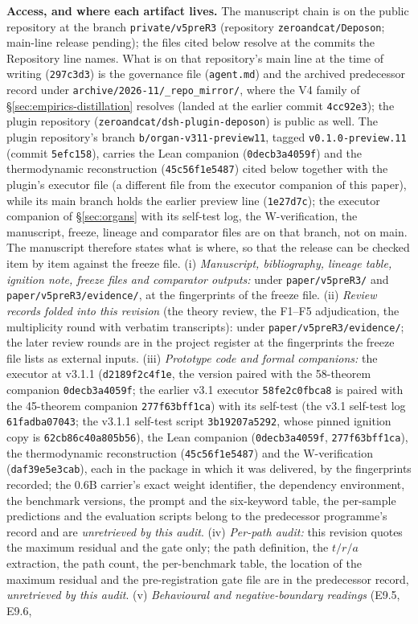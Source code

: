 \documentclass[11pt,a4paper]{article}
\begin{document}
\textbf{Access, and where each artifact lives.} The manuscript chain is on the public repository at the branch \texttt{private/}\allowbreak\texttt{v5preR3} (repository \texttt{zeroandcat/}\allowbreak\texttt{Deposon}; main-line release pending); the files cited below resolve at the commits the Repository line names. What is on that repository's main line at the time of writing (\texttt{297c3d3}) is the governance file (\texttt{agent.md}) and the archived predecessor record under \texttt{archive/2026-11/\_repo\_mirror/}, where the V4 family of \S\ref{sec:empirics-distillation} resolves (landed at the earlier commit \texttt{4cc92e3}); the plugin repository (\texttt{zeroandcat/}\allowbreak\texttt{dsh-plugin-deposon}) is public as well. The plugin repository's branch \texttt{b/organ-v311-preview11}, tagged \texttt{v0.1.0-preview.11} (commit \texttt{5efc158}), carries the Lean companion (\texttt{0decb3a4059f}) and the thermodynamic reconstruction (\texttt{45c56f1e5487}) cited below together with the plugin's executor file (a different file from the executor companion of this paper), while its main branch holds the earlier preview line (\texttt{1e27d7c}); the executor companion of \S\ref{sec:organs} with its self-test log, the W-verification, the manuscript, freeze, lineage and comparator files are on that branch, not on main. The manuscript therefore states what is where, so that the release can be checked item by item against the freeze file. (i) \emph{Manuscript, bibliography, lineage table, ignition note, freeze files and comparator outputs:} under \texttt{paper/v5preR3/} and \texttt{paper/v5preR3/evidence/}, at the fingerprints of the freeze file. (ii) \emph{Review records folded into this revision} (the theory review, the F1--F5 adjudication, the multiplicity round with verbatim transcripts): under \texttt{paper/v5preR3/evidence/}; the later review rounds are in the project register at the fingerprints the freeze file lists as external inputs. (iii) \emph{Prototype code and formal companions:} the executor at v3.1.1 (\texttt{d2189f2c4f1e}, the version paired with the 58-theorem companion \texttt{0decb3a4059f}; the earlier v3.1 executor \texttt{58fe2c0fbca8} is paired with the 45-theorem companion \texttt{277f63bff1ca}) with its self-test (the v3.1 self-test log \texttt{61fadba07043}; the v3.1.1 self-test script \texttt{3b19207a5292}, whose pinned ignition copy is \texttt{62cb86c40a805b56}), the Lean companion (\texttt{0decb3a4059f}, \texttt{277f63bff1ca}), the thermodynamic reconstruction (\texttt{45c56f1e5487}) and the W-verification (\texttt{daf39e5e3cab}), each in the package in which it was delivered, by the fingerprints recorded; the 0.6B carrier's exact weight identifier, the dependency environment, the benchmark versions, the prompt and the six-keyword table, the per-sample predictions and the evaluation scripts belong to the predecessor programme's record and are \emph{unretrieved by this audit}. (iv) \emph{Per-path audit:} this revision quotes the maximum residual and the gate only; the path definition, the $t/r/a$ extraction, the path count, the per-benchmark table, the location of the maximum residual and the pre-registration gate file are in the predecessor record, \emph{unretrieved by this audit}. (v) \emph{Behavioural and negative-boundary readings} (E9.5, E9.6, 
\end{document}
